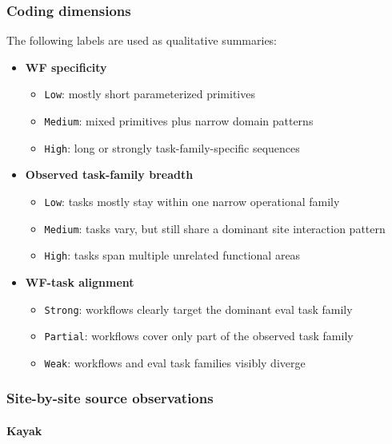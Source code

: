 \subsubsection{Coding dimensions}

The following labels are used as qualitative summaries:

\begin{itemize}
\item
  \textbf{WF specificity}

  \begin{itemize}
  \tightlist
  \item
    \texttt{Low}: mostly short parameterized primitives
  \item
    \texttt{Medium}: mixed primitives plus narrow domain patterns
  \item
    \texttt{High}: long or strongly task-family-specific sequences
  \end{itemize}
\item
  \textbf{Observed task-family breadth}

  \begin{itemize}
  \tightlist
  \item
    \texttt{Low}: tasks mostly stay within one narrow operational family
  \item
    \texttt{Medium}: tasks vary, but still share a dominant site
    interaction pattern
  \item
    \texttt{High}: tasks span multiple unrelated functional areas
  \end{itemize}
\item
  \textbf{WF-task alignment}

  \begin{itemize}
  \tightlist
  \item
    \texttt{Strong}: workflows clearly target the dominant eval task
    family
  \item
    \texttt{Partial}: workflows cover only part of the observed task
    family
  \item
    \texttt{Weak}: workflows and eval task families visibly diverge
  \end{itemize}
\end{itemize}

\subsubsection{Site-by-site source
observations}

\paragraph{Kayak}

